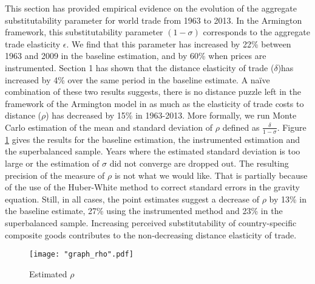 \documentclass[12pt,twoside,a4paper,notitlepage]{article}
\begin{document}
This section has provided empirical evidence on the evolution of the aggregate substitutability parameter for world trade from 1963 to 2013.
In the Armington framework, this substitutability parameter $(1-\sigma)$ corresponds to the aggregate trade elasticity  $\epsilon$.
We find that this parameter has increased by 22\% between 1963 and 2009 in the baseline estimation, and by 60\% when prices are instrumented.
Section 1 has shown that the distance elasticity of trade ($\delta$)has increased by 4\% over the same period in the baseline estimate.
A naïve combination of these two results suggests, there is no distance puzzle left in the framework of the Armington model in as much as the elasticity of trade costs to distance ($\rho$) has decreased by 15\% in 1963-2013.
More formally, we run Monte Carlo estimation of the mean and standard deviation of $\rho$ defined as $\frac{\delta}{1-\sigma}$. Figure \ref{fig:rho} gives the results for the baseline estimation, the instrumented estimation and the superbalanced sample.
Years where the estimated standard deviation is too large or the estimation of $\sigma$ did not converge are dropped out. The resulting precision of the measure of $\rho$ is not what we would like.
That is partially because of the use of the Huber-White method to correct standard errors in the gravity equation.
Still, in all cases, the point estimates suggest a decrease of $\rho$ by 13\% in the baseline estimate, 27\% using the instrumented method and 23\% in the superbalanced sample.
Increasing perceived substitutability of country-specific composite goods contributes to the non-decreasing distance elasticity of trade.


\begin{figure}[H]
	\caption{Estimated $\rho$ }
	\texttt{[image: "graph\_rho".pdf]}
	\label{fig:rho}
\end{figure}

\end{document}

